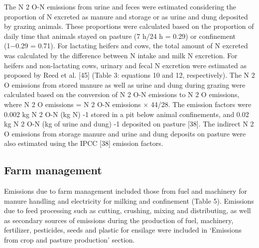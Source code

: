 \documentclass[11pt,a4paper]{article}
\begin{document}
The N 2 O-N emissions from urine and feces were estimated considering the proportion of N excreted as manure and storage or as urine and dung deposited by grazing animals. These proportions were calculated based on the proportion of daily time that animals stayed on pasture (7 h/24 h = 0.29) or confinement (1−0.29 = 0.71). For lactating heifers and cows, the total amount of N excreted was calculated by the difference between N intake and milk N excretion. For heifers and non-lactating cows, urinary and fecal N excretion were estimated as proposed by Reed et al. [45] (Table 3: equations 10 and 12, respectively). The N 2 O emissions from stored manure as well as urine and dung during grazing were calculated based on the conversion of N 2 O-N emissions to N 2 O emissions, where N 2 O emissions = N 2 O-N emissions × 44/28. The emission factors were 0.002 kg N 2 O-N (kg N) -1 stored in a pit below animal confinements, and 0.02 kg N 2 O-N (kg of urine and dung) -1 deposited on pasture [38]. The indirect N 2 O emissions from storage manure and urine and dung deposits on pasture were also estimated using the IPCC [38] emission factors.

\subsection{Farm management}

Emissions due to farm management included those from fuel and machinery for manure handling and electricity for milking and confinement (Table 5). Emissions due to feed processing such as cutting, crushing, mixing and distributing, as well as secondary sources of emissions during the production of fuel, machinery, fertilizer, pesticides, seeds and plastic for ensilage were included in ‘Emissions from crop and pasture production’ section.
\end{document}
